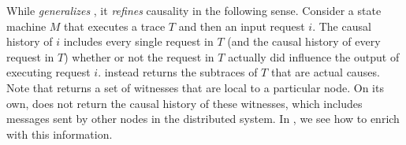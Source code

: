 While \watprovenance{} \emph{generalizes} \whyprovenance{}, it \emph{refines}
causality in the following sense. Consider a state machine $M$ that executes a
trace $T$ and then an input request $i$. The causal history of $i$ includes
every single request in $T$ (and the causal history of every request in $T$)
whether or not the request in $T$ actually did influence the output of
executing request $i$. \Watprovenance{} instead returns the subtraces of $T$
that are actual causes. Note that \watprovenance{} returns a set of witnesses
that are local to a particular node. On its own, \watprovenance{} does not
return the causal history of these witnesses, which includes messages sent by
other nodes in the distributed system. In , we see how to enrich
\watprovenance{} with this information.
